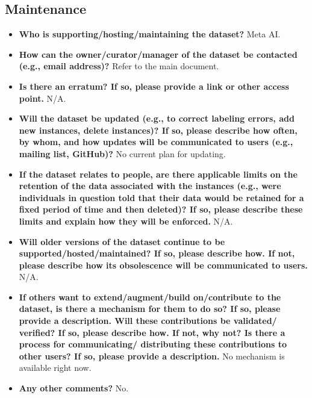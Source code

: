 \subsection{Maintenance}
\begin{itemize}
    \item \textbf{Who is supporting/hosting/maintaining the dataset?} Meta AI.
    \item \textbf{How can the owner/curator/manager of the dataset be contacted (e.g., email address)?} Refer to the main document.
    \item \textbf{Is there an erratum? If so, please provide a link or other access point.} N/A.
    \item \textbf{Will the dataset be updated (e.g., to correct labeling errors, add new instances, delete instances)? If so, please describe how often, by whom, and how updates will be communicated to users (e.g., mailing list, GitHub)?} No current plan for updating.
    \item \textbf{If the dataset relates to people, are there applicable limits on the retention of the data associated with the instances (e.g., were individuals in question told that their data would be retained for a fixed period of time and then deleted)? If so, please describe these limits and explain how they will be enforced.} N/A.
    \item \textbf{Will older versions of the dataset continue to be supported/hosted/maintained? If so, please describe how. If not, please describe how its obsolescence will be communicated to users.} N/A.
    \item \textbf{If others want to extend/augment/build on/contribute to the dataset, is there a mechanism for them to do so? If so, please provide a description. Will these contributions be validated/ verified? If so, please describe how. If not, why not? Is there a process for communicating/ distributing these contributions to other users? If so, please provide a description.} No mechanism is available right now.
    \item \textbf{Any other comments?} No.
\end{itemize}